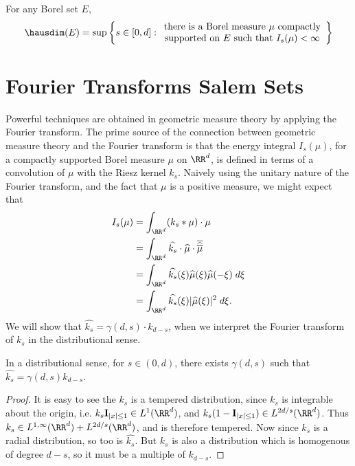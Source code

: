 \begin{theorem}
	For any Borel set $E$,
	\[ \hausdim(E) = \sup \left\{ s \in [0,d]: \begin{array}{c}
            \text{there is a Borel measure $\mu$ compactly}\\
             \text{supported on $E$ such that $I_s(\mu) < \infty$}
        \end{array} \right\} \]
\end{theorem}

\section{Fourier Transforms Salem Sets}

Powerful techniques are obtained in geometric measure theory by applying the Fourier transform. The prime source of the connection between geometric measure theory and the Fourier transform is that the energy integral $I_s(\mu)$, for a compactly supported Borel measure $\mu$ on $\RR^d$, is defined in terms of a convolution of $\mu$ with the Riesz kernel $k_s$. Naively using the unitary nature of the Fourier transform, and the fact that $\mu$ is a positive measure, we might expect that
%
\begin{align*}
	I_s(\mu) &= \int_{\RR^d} (k_s * \mu) \cdot \mu\\
	&= \int_{\RR^d} \widehat{k_s} \cdot \widehat{\mu} \cdot \overline{\widehat{\overline{\mu}}}\\
	&= \int_{\RR^d} \widehat{k_s}(\xi) \widehat{\mu}(\xi) \widehat{\mu}(-\xi)\; d\xi\\
	&= \int_{\RR^d} \widehat{k_s}(\xi) |\widehat{\mu}(\xi)|^2\; d\xi.
\end{align*}
%
We will show that $\widehat{k_s} = \gamma(d,s) \cdot k_{d-s}$, when we interpret the Fourier transform of $k_s$ in the distributional sense.

\begin{lemma}
	In a distributional sense, for $s \in (0,d)$, there exists $\gamma(d,s)$ such that $\widehat{k_s} = \gamma(d,s) k_{d-s}$.
\end{lemma}
\begin{proof}
	It is easy to see the $k_s$ is a tempered distribution, since $k_s$ is integrable about the origin, i.e. $k_s \mathbf{I}_{|x| \leq 1} \in L^1(\RR^d)$, and $k_s(1 - \mathbf{I}_{|x| \leq 1}) \in L^{2d/s}(\RR^d)$. Thus $k_s \in L^{1,\infty}(\RR^d) + L^{2d/s}(\RR^d)$, and is therefore tempered. Now since $k_s$ is a radial distribution, so too is $\widehat{k_s}$. But $k_s$ is also a distribution which is homogenous of degree $d-s$, so it must be a multiple of $k_{d-s}$.
\end{proof}

